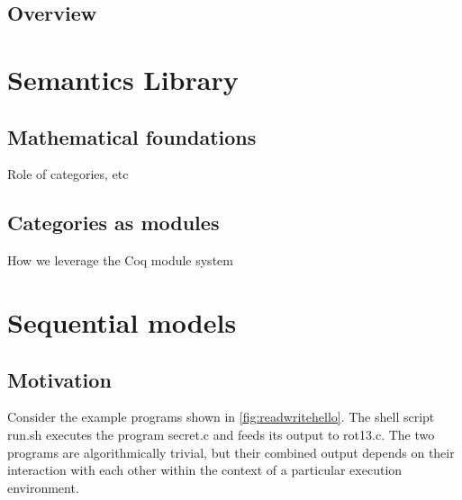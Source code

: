 \documentclass{report}
\begin{document}
\section{Overview}

\newpage


\chapter{Semantics Library} %

\section{Mathematical foundations}

Role of categories, etc

\section{Categories as modules}

How we leverage the Coq module system


\newpage
\chapter{Sequential models} %

\section{Motivation} %

Consider the example programs shown in \autoref{fig:readwritehello}.
The shell script \textsf{run.sh}
executes the program \textsf{secret.c}
and feeds its output to \textsf{rot13.c}.
The two programs are algorithmically trivial,
but their combined output depends on their interaction with each other
within the context of a particular execution environment.
\end{document}
